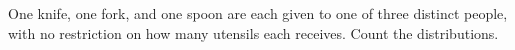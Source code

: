 One knife, one fork, and one spoon are each given to one of three distinct people, with no restriction on how many utensils each receives. Count the distributions.
